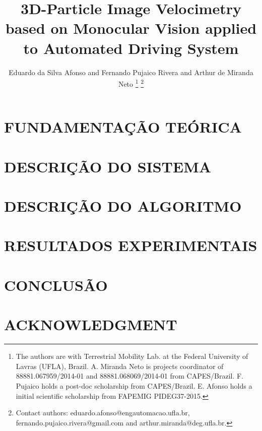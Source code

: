 \documentclass[letterpaper, 10 pt,conference]{ieeeconf}  %
\title{\LARGE \bf
3D-Particle Image Velocimetry based on Monocular Vision applied to Automated Driving System
}
\author{Eduardo da Silva Afonso and Fernando Pujaico Rivera and Arthur de Miranda Neto%
\thanks{The authors are with Terrestrial Mobility Lab. at the Federal University of Lavras (UFLA), Brazil. 
A. Miranda Neto is projects coordinator
of 88881.067959/2014-01 and 88881.068069/2014-01 from CAPES/Brazil. 
F. Pujaico holds a post-doc scholarship from CAPES/Brazil. 
E. Afonso holds a initial scientific scholarship from FAPEMIG PIDEG37-2015.}%
\thanks{Contact authors: eduardo.afonso@engautomacao.ufla.br, fernando.pujaico.rivera@gmail.com and
arthur.miranda@deg.ufla.br.}%
}
\begin{document}
\maketitle
\thispagestyle{empty}
\pagestyle{empty}

\begin{abstract}



\end{abstract}



\section{FUNDAMENTAÇÃO TEÓRICA}




\section{DESCRIÇÃO DO SISTEMA}


\section{DESCRIÇÃO DO ALGORITMO}
 





\section{RESULTADOS EXPERIMENTAIS}





\section{CONCLUSÃO}


\section*{ACKNOWLEDGMENT}


\end{document}
